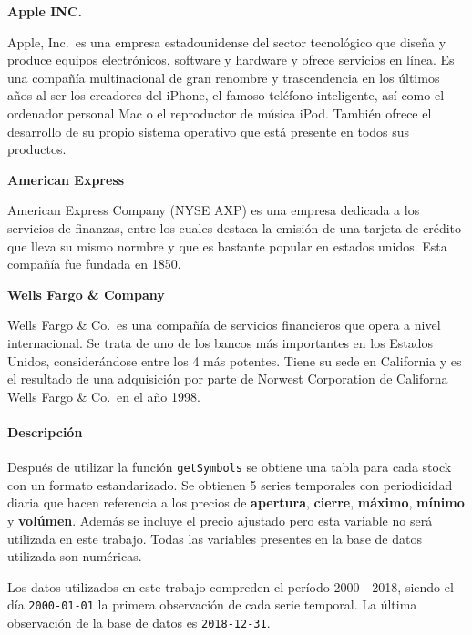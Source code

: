 \documentclass[]{DissertateUSU}
\let\oldparagraph\paragraph
\renewcommand{\paragraph}[1]{\oldparagraph{#1}\mbox{}}
\begin{document}
\textbf{Apple INC.}

\noindent Apple, Inc.~es una empresa estadounidense del sector
tecnológico que diseña y produce equipos electrónicos, software y
hardware y ofrece servicios en línea. Es una compañía multinacional de
gran renombre y trascendencia en los últimos años al ser los creadores
del iPhone, el famoso teléfono inteligente, así como el ordenador
personal Mac o el reproductor de música iPod. También ofrece el
desarrollo de su propio sistema operativo que está presente en todos sus
productos.

\textbf{American Express}

\noindent American Express Company (NYSE AXP) es una empresa dedicada a
los servicios de finanzas, entre los cuales destaca la emisión de una
tarjeta de crédito que lleva su mismo normbre y que es bastante popular
en estados unidos. Esta compañía fue fundada en 1850.

\textbf{Wells Fargo \& Company}

\noindent Wells Fargo \& Co.~es una compañía de servicios financieros
que opera a nivel internacional. Se trata de uno de los bancos más
importantes en los Estados Unidos, considerándose entre los 4 más
potentes. Tiene su sede en California y es el resultado de una
adquisición por parte de Norwest Corporation de Californa Wells Fargo \&
Co.~en el año 1998.

\hypertarget{descripcion}{%
\paragraph{Descripción}\label{descripcion}}

\noindent Después de utilizar la función \texttt{getSymbols} se obtiene
una tabla para cada stock con un formato estandarizado. Se obtienen 5
series temporales con periodicidad diaria que hacen referencia a los
precios de \textbf{apertura}, \textbf{cierre}, \textbf{máximo},
\textbf{mínimo} y \textbf{volúmen}. Además se incluye el precio ajustado
pero esta variable no será utilizada en este trabajo. Todas las
variables presentes en la base de datos utilizada son numéricas.

\setlength\parskip{5ex}
\justifying

\noindent Los datos utilizados en este trabajo compreden el período 2000
- 2018, siendo el día \texttt{2000-01-01} la primera observación de cada
serie temporal. La última observación de la base de datos es
\texttt{2018-12-31}.

\setlength\parskip{5ex}
\justifying
\end{document}
